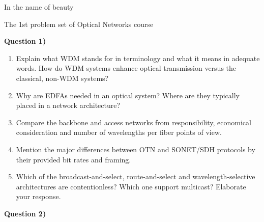 \documentclass[10pt,letterpaper]{article}
\newcommand{\Q}[1]{\textbf{Question #1)}}
\begin{document}
\Large
\begin{center}
In the name of beauty

The 1st problem set of Optical Networks course

\hrulefill
\end{center}
\Q1

\begin{enumerate}[label=\alph*)]
\item
Explain what WDM stands for in terminology and what it means in adequate words. How do WDM systems enhance optical transmission versus the classical, non-WDM systems?
\item
Why are EDFAs needed in an optical system? Where are they typically placed in a network architecture?
\item
Compare the backbone and access networks from responsibility, economical consideration and number of wavelengths per fiber points of view.
\item
Mention the major differences between OTN and SONET/SDH protocols by their provided bit rates and framing.
\item
Which of the broadcast-and-select, route-and-select and wavelength-selective architectures are contentionless? Which one support multicast? Elaborate your response.
\end{enumerate}

\Q2
\end{document}
